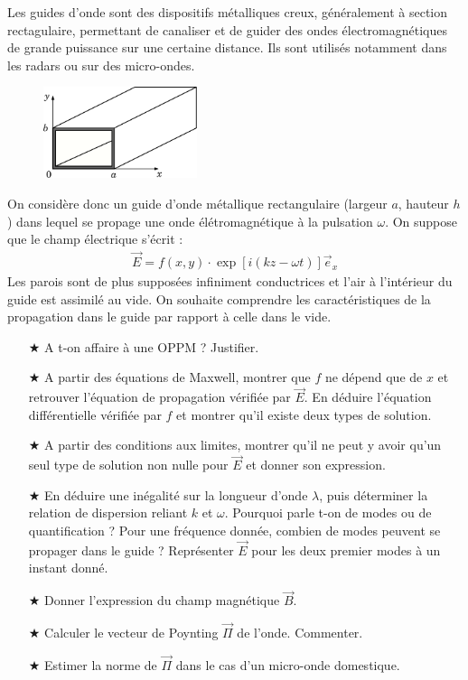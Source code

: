 \documentclass{report}
\begin{document}
Les guides d'onde sont des dispositifs métalliques creux, généralement à section rectagulaire, permettant de canaliser et de guider des ondes électromagnétiques de grande puissance sur une certaine distance. Ils sont utilisés notamment dans les radars ou sur des micro-ondes. 

\begin{figure}[h!]
\centering
  \includegraphics[width=0.4\textwidth]{guide_onde.pdf}
\end{figure}

On considère donc un guide d'onde métallique rectangulaire (largeur $a$, hauteur $h$) dans lequel se propage une onde élétromagnétique à la pulsation $\omega$. On suppose que le champ électrique s'écrit :
\begin{align*}
	\vec{E}=f(x,y)\cdot\exp[i(kz-\omega t)]\vec{e}_x
\end{align*}
Les parois sont de plus supposées infiniment conductrices et l'air à l'intérieur du guide est assimilé au vide. On souhaite comprendre les caractéristiques de la propagation dans le guide par rapport à celle dans le vide.

\begin{itemize}

	\item[$\bigstar$] A t-on affaire à une OPPM ? Justifier.
	
	\item[$\bigstar$] A partir des équations de Maxwell, montrer que $f$ ne dépend que de $x$ et retrouver l'équation de propagation vérifiée par $\vec{E}$. En déduire l'équation différentielle vérifiée par $f$ et montrer qu'il existe deux types de solution.
	
	\item[$\bigstar$]  A partir des conditions aux limites, montrer qu'il ne peut y avoir qu'un seul type de solution non nulle pour $\vec{E}$ et donner son expression. 
	
	\item[$\bigstar$] En déduire une inégalité sur la longueur d'onde $\lambda$, puis déterminer la relation de dispersion reliant $k$ et $\omega$. Pourquoi parle t-on de modes ou de quantification ? Pour une fréquence donnée, combien de modes peuvent se propager dans le guide ? Représenter $\vec{E}$ pour les deux premier modes à un instant donné.
	
	\item[$\bigstar$] Donner l'expression du champ magnétique $\vec{B}$. 
	
	\item[$\bigstar$] Calculer le vecteur de Poynting $\vec{\Pi}$ de l'onde. Commenter.
	
	\item[$\bigstar$] Estimer la norme de $\vec{\Pi}$ dans le cas d'un micro-onde domestique.

\end{itemize}
\end{document}
